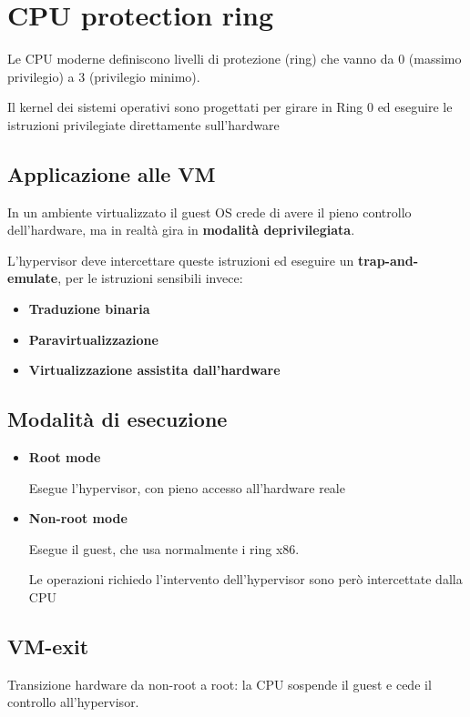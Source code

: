 \section{CPU protection ring}
Le CPU moderne definiscono livelli di protezione (ring) che vanno da 0 (massimo privilegio) a 3 (privilegio minimo).

Il kernel dei sistemi operativi sono progettati per girare in Ring 0 ed eseguire le istruzioni privilegiate direttamente sull'hardware

\subsection{Applicazione alle VM}
In un ambiente virtualizzato il guest OS crede di avere il pieno controllo dell'hardware, ma in realtà gira in \textbf{modalità deprivilegiata}.


L'hypervisor deve intercettare queste istruzioni ed eseguire un \textbf{trap-and-emulate}, per le istruzioni sensibili invece:
\begin{itemize}
    \item \textbf{Traduzione binaria}
    \item \textbf{Paravirtualizzazione}
    \item \textbf{Virtualizzazione assistita dall'hardware}
\end{itemize}

\subsection{Modalità di esecuzione}
\begin{itemize}
    \item \textbf{Root mode}

    Esegue l'hypervisor, con pieno accesso all'hardware reale

    \item \textbf{Non-root mode}

    Esegue il guest, che usa normalmente i ring x86.

    Le operazioni richiedo l'intervento dell'hypervisor sono però intercettate dalla CPU
\end{itemize}

\subsection{VM-exit}
Transizione hardware da non-root a root: la CPU sospende il guest e cede il controllo all'hypervisor.

